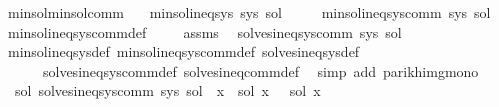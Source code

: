 \begin{isabellebody}
\isamarkupfalse%
\ min{\isacharunderscore}{\kern0pt}sol{\isacharunderscore}{\kern0pt}min{\isacharunderscore}{\kern0pt}sol{\isacharunderscore}{\kern0pt}comm{\isacharcolon}{\kern0pt}\isanewline
\ \ \ {\isachardoublequoteopen}min{\isacharunderscore}{\kern0pt}sol{\isacharunderscore}{\kern0pt}ineq{\isacharunderscore}{\kern0pt}sys\ sys\ sol{\isachardoublequoteclose}\isanewline
\ \ \ \ \ {\isachardoublequoteopen}min{\isacharunderscore}{\kern0pt}sol{\isacharunderscore}{\kern0pt}ineq{\isacharunderscore}{\kern0pt}sys{\isacharunderscore}{\kern0pt}comm\ sys\ sol{\isachardoublequoteclose}\isanewline
%
\isadelimproof
%
\endisadelimproof
%
\isatagproof
{}\isamarkupfalse%
\ min{\isacharunderscore}{\kern0pt}sol{\isacharunderscore}{\kern0pt}ineq{\isacharunderscore}{\kern0pt}sys{\isacharunderscore}{\kern0pt}comm{\isacharunderscore}{\kern0pt}def\ \isamarkupfalse%
\isanewline
\ \ \isamarkupfalse%
\ assms\ \isamarkupfalse%
\ {\isachardoublequoteopen}solves{\isacharunderscore}{\kern0pt}ineq{\isacharunderscore}{\kern0pt}sys{\isacharunderscore}{\kern0pt}comm\ sys\ sol{\isachardoublequoteclose}\isanewline
\ \ \ \ \isamarkupfalse%
\ min{\isacharunderscore}{\kern0pt}sol{\isacharunderscore}{\kern0pt}ineq{\isacharunderscore}{\kern0pt}sys{\isacharunderscore}{\kern0pt}def\ min{\isacharunderscore}{\kern0pt}sol{\isacharunderscore}{\kern0pt}ineq{\isacharunderscore}{\kern0pt}sys{\isacharunderscore}{\kern0pt}comm{\isacharunderscore}{\kern0pt}def\ solves{\isacharunderscore}{\kern0pt}ineq{\isacharunderscore}{\kern0pt}sys{\isacharunderscore}{\kern0pt}def\isanewline
\ \ \ \ \ \ solves{\isacharunderscore}{\kern0pt}ineq{\isacharunderscore}{\kern0pt}sys{\isacharunderscore}{\kern0pt}comm{\isacharunderscore}{\kern0pt}def\ solves{\isacharunderscore}{\kern0pt}ineq{\isacharunderscore}{\kern0pt}comm{\isacharunderscore}{\kern0pt}def\ \isamarkupfalse%
\ {\isacharparenleft}{\kern0pt}simp\ add{\isacharcolon}{\kern0pt}\ parikh{\isacharunderscore}{\kern0pt}img{\isacharunderscore}{\kern0pt}mono{\isacharparenright}{\kern0pt}\isanewline
\ \ \isamarkupfalse%
\ {\isachardoublequoteopen}\ {\isasymforall}sol{\isacharprime}{\kern0pt}{\isachardot}{\kern0pt}\ solves{\isacharunderscore}{\kern0pt}ineq{\isacharunderscore}{\kern0pt}sys{\isacharunderscore}{\kern0pt}comm\ sys\ sol{\isacharprime}{\kern0pt}\ {\isasymlongrightarrow}\ {\isacharparenleft}{\kern0pt}{\isasymforall}x{\isachardot}{\kern0pt}\ {\isasymPsi}\ {\isacharparenleft}{\kern0pt}sol\ x{\isacharparenright}{\kern0pt}\ {\isasymsubseteq}\ {\isasymPsi}\ {\isacharparenleft}{\kern0pt}sol{\isacharprime}{\kern0pt}\ x{\isacharparenright}{\kern0pt}{\isacharparenright}{\kern0pt}{\isachardoublequoteclose}\isanewline

\end{isabellebody}
